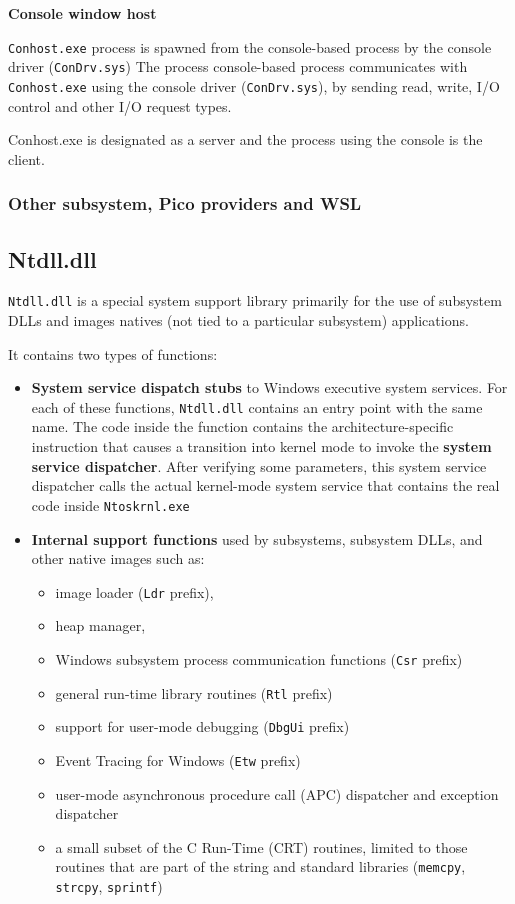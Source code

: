 {\bf Console window host}

\verb+Conhost.exe+ process is spawned from the console-based process by the console driver (\verb+ConDrv.sys+) The process console-based process communicates with \verb+Conhost.exe+ using the console driver (\verb+ConDrv.sys+), by sending read, write, I/O control and other I/O request types.

Conhost.exe is designated as a server and the process using the console is the client.

\subsubsection{Other subsystem, Pico providers and WSL}


\subsection{Ntdll.dll}

\verb+Ntdll.dll+ is a special system support library primarily for the use of subsystem DLLs and images natives (not tied to a particular subsystem) applications.

It contains two types of functions:
\begin{itemize}
    \item {\bf System service dispatch stubs} to Windows executive system services. For each of these functions, \verb+Ntdll.dll+ contains an entry point with the same name. The code inside the function contains the architecture-specific instruction that causes a transition into kernel mode to invoke the {\bf system service dispatcher}. After verifying some parameters, this system service dispatcher calls the actual kernel-mode system service that contains the real code inside \verb+Ntoskrnl.exe+
    
    \item {\bf Internal support functions} used by subsystems, subsystem DLLs, and other native images such as:
        \begin{itemize}
            \item image loader (\verb+Ldr+ prefix), 
            \item heap manager, 
            \item Windows subsystem process communication functions (\verb+Csr+ prefix)
            \item general run-time library routines (\verb+Rtl+ prefix)
            \item support for user-mode debugging (\verb+DbgUi+ prefix)
            \item Event Tracing for Windows (\verb+Etw+ prefix)
            \item user-mode asynchronous procedure call (APC) dispatcher and exception dispatcher
            \item a small subset of the C Run-Time (CRT) routines, limited to those routines that are part of the string and standard libraries (\verb+memcpy+, \verb+strcpy+, \verb+sprintf+)
        \end{itemize} 

\end{itemize}

